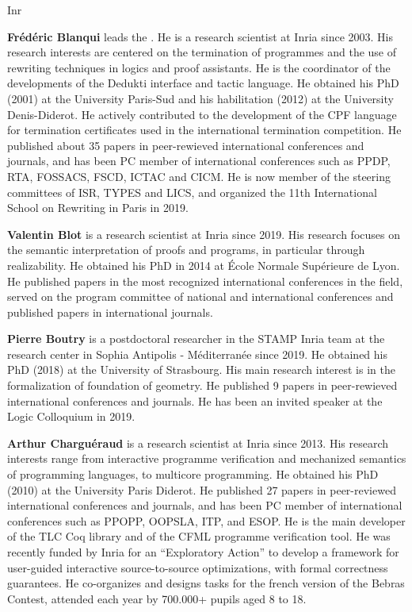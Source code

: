 \begin{sitedescription}{Inr}
\begin{compactitem}
\item{\bf Frédéric Blanqui} leads the . He is a research scientist at Inria since 2003. His research interests are centered on the termination of programmes and the use of rewriting techniques in logics and proof assistants. He is the coordinator of the developments of the Dedukti interface and tactic language. He obtained his PhD (2001) at the University Paris-Sud and his habilitation (2012) at the University Denis-Diderot. He actively contributed to the development of the CPF language for termination certificates used in the international termination competition. He published about 35 papers in peer-rewieved international conferences and journals, and has been PC member of international conferences such as PPDP, RTA, FOSSACS, FSCD, ICTAC and CICM. He is now member of the steering committees of ISR, TYPES and LICS, and organized the 11th International School on Rewriting in Paris in 2019.

\item{\bf Valentin Blot} is a research scientist at Inria since 2019. His research focuses on the semantic interpretation of proofs and programs, in particular through realizability. He obtained his PhD in 2014 at \'Ecole Normale Sup\'erieure de Lyon. He published papers in the most recognized international conferences in the field, served on the program committee of national and international conferences and published papers in international journals.

\item{\bf Pierre Boutry} is a postdoctoral researcher in the STAMP Inria team at the research center in Sophia Antipolis - M\'editerran\'ee since 2019.
He obtained his PhD (2018) at the University of Strasbourg.
His main research interest is in the formalization of foundation of geometry.
He published 9 papers in peer-rewieved international conferences and journals.
He has been an invited speaker at the Logic Colloquium in 2019.

\item{\bf Arthur Charguéraud} is a research scientist at Inria since 2013.
His research interests range from interactive programme verification and mechanized
semantics of programming languages, to multicore programming.
He obtained his PhD (2010) at the University Paris Diderot. He published 27 papers
in peer-reviewed international conferences and journals, and has been PC member
of international conferences such as PPOPP, OOPSLA, ITP, and ESOP. He is the main
developer of the TLC Coq library and of the CFML programme verification tool.
He was recently funded by Inria for an ``Exploratory Action'' to develop a framework
for user-guided interactive source-to-source optimizations, with formal correctness
guarantees.
He co-organizes and designs tasks for the french version of the Bebras Contest,
attended each year by 700.000+ pupils aged 8 to 18.


\end{compactitem}
\end{sitedescription}
